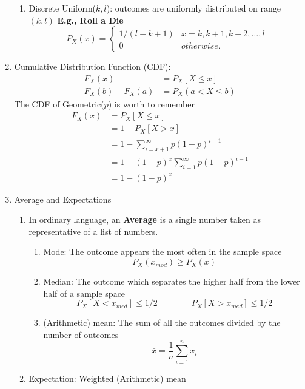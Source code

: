 \begin{enumerate}
{\begin{enumerate}
{            }
            \item Discrete Uniform($k, l$): outcomes are uniformly distributed on range $(k, l)$ \textbf{E.g., Roll a Die}{
                \[ P_X(x) = 
                \begin{cases}
                    1/(l-k+1)   & x=k,k+1,k+2,\ldots,l \\
                    0   & otherwise.
                \end{cases} \]
            }            
        \end{enumerate}
    }
    \item Cumulative Distribution Function (CDF): {
        \begin{align*}
            F_X(x)&=P_X[X\leq x] \\
            F_X(b)-F_X(a)&=P_X(a<X\leq b)
        \end{align*}
        The CDF of Geometric($p$) is worth to remember
        \begin{align*}
            F_X(x)
            &= P_X[X\leq x] \\
            &= 1-P_X[X > x] \\
            &= 1-\sum_{i=x+1}^{\infty}p(1-p)^{i-1} \\
            &= 1-(1-p)^x\sum_{i=1}^{\infty}p(1-p)^{i-1} \\
            &= 1-(1-p)^x
        \end{align*}
    }
    \item Average and Expectations{
        \begin{enumerate}
            \item In ordinary language, an \textbf{Average} is a single number taken as representative of a list of numbers.{
            \begin{enumerate}
                \item Mode: The outcome appears the most often in the sample space \[P_X(x_{mod})\geq P_X(x)\]
                \item Median: The outcome which separates the higher half from  the lower half of a sample space \[P_X[X < x_{med}] \leq 1/2 \qquad \qquad P_X[X > x_{med}] \leq 1/2\]
                \item (Arithmetic) mean:  The sum of all the outcomes divided by the number of outcomes \[\bar{x} = \frac{1}{n}\sum_{i=1}^{n}x_i\]
            \end{enumerate}
            }
            \item Expectation: Weighted (Arithmetic) mean{
                \begin{enumerate}

\end{enumerate}}
\end{enumerate}}
\end{enumerate}
